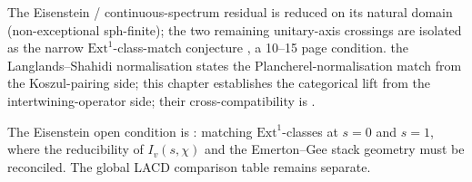 The Eisenstein / continuous-spectrum residual
 is reduced on its
natural domain (non-exceptional sph-finite); the two remaining
unitary-axis crossings are isolated as the narrow
\(\mathrm{Ext}^1\)-class-match conjecture
, a 10--15
page condition. the Langlands--Shahidi normalisation states the Plancherel-normalisation match from the
Koszul-pairing side; this chapter establishes the categorical lift
from the intertwining-operator side; their cross-compatibility is
.

The Eisenstein open condition is
: matching
\(\mathrm{Ext}^1\)-classes at \(s=0\) and \(s=1\), where the
reducibility of \(I_v(s,\chi)\) and the Emerton--Gee stack geometry
must be reconciled. The global LACD comparison table remains separate.
